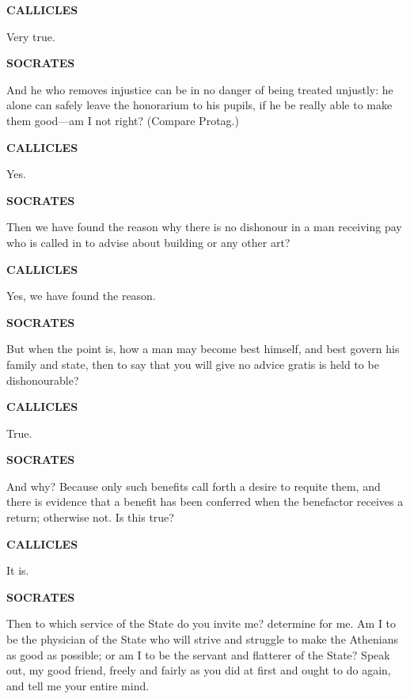 \documentclass[11pt,letter]{article}
\begin{document}
\par \textbf{CALLICLES}
\par   Very true.

\par \textbf{SOCRATES}
\par   And he who removes injustice can be in no danger of being treated unjustly:  he alone can safely leave the honorarium to his pupils, if he be really able to make them good—am I not right? (Compare Protag.)

\par \textbf{CALLICLES}
\par   Yes.

\par \textbf{SOCRATES}
\par   Then we have found the reason why there is no dishonour in a man receiving pay who is called in to advise about building or any other art?

\par \textbf{CALLICLES}
\par   Yes, we have found the reason.

\par \textbf{SOCRATES}
\par   But when the point is, how a man may become best himself, and best govern his family and state, then to say that you will give no advice gratis is held to be dishonourable?

\par \textbf{CALLICLES}
\par   True.

\par \textbf{SOCRATES}
\par   And why? Because only such benefits call forth a desire to requite them, and there is evidence that a benefit has been conferred when the benefactor receives a return; otherwise not. Is this true?

\par \textbf{CALLICLES}
\par   It is.

\par \textbf{SOCRATES}
\par   Then to which service of the State do you invite me? determine for me. Am I to be the physician of the State who will strive and struggle to make the Athenians as good as possible; or am I to be the servant and flatterer of the State? Speak out, my good friend, freely and fairly as you did at first and ought to do again, and tell me your entire mind.
\end{document}
